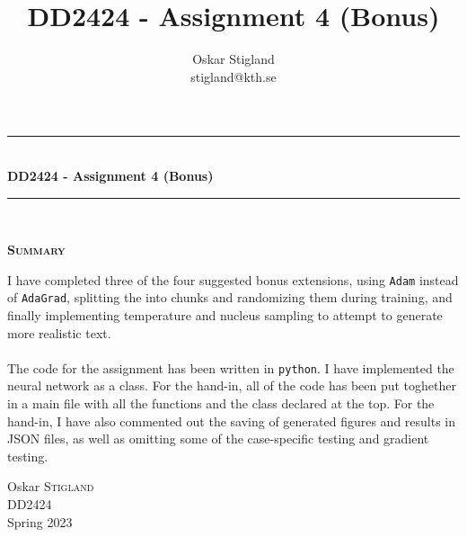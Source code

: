 \documentclass{article}
\title{DD2424 - Assignment 4 (Bonus)}
\author{Oskar Stigland \\ stigland@kth.se}
\begin{document}

	\begin{titlepage}
		\begin{center} 
			
			\rule{\linewidth}{0.5mm}\\[0.5 cm]
			{ \huge \bfseries DD2424 - Assignment 4 (Bonus)}\\[0.3 cm] %
			\rule{\linewidth}{0.5mm}\\[1 cm]
					
			\small\vfill
			\begin{center}
			\centering
			{\large \bfseries \textsc{Summary}}\\
			\vspace{1cm}
			\begin{minipage}{10cm}
				
				I have completed three of the four suggested bonus extensions, using \texttt{Adam} instead of \texttt{AdaGrad}, splitting the into chunks and randomizing them during training, and finally implementing temperature and nucleus sampling to attempt to generate more realistic text.\\\\
%
	The code for the assignment has been written in \texttt{python}. I have implemented the neural network as a class. For the hand-in, all of the code has been put toghether in a main file with all the functions and the class declared at the top. For the hand-in, I have also commented out the saving of generated figures and results in JSON files, as well as omitting some of the case-specific testing and gradient testing.
			\end{minipage}
			\end{center}
			\large\vfill
						

		\end{center}	
		
		\begin{minipage}{0.4\textwidth}
			\begin{flushleft} \large
				Oskar \textsc{Stigland}\\
				DD2424\\
				Spring 2023
			\end{flushleft}
		\end{minipage}	

	\end{titlepage}
\end{document}
